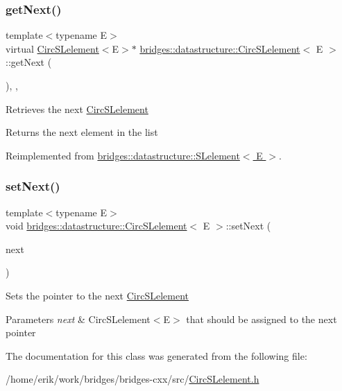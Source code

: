 \subsubsection{\texorpdfstring{get\+Next()}{getNext()}}
{\footnotesize\ttfamily template$<$typename E$>$ \\
virtual \hyperlink{classbridges_1_1datastructure_1_1_circ_s_lelement}{Circ\+S\+Lelement}$<$E$>$$\ast$ \hyperlink{classbridges_1_1datastructure_1_1_circ_s_lelement}{bridges\+::datastructure\+::\+Circ\+S\+Lelement}$<$ E $>$\+::get\+Next (\begin{DoxyParamCaption}{ }\end{DoxyParamCaption})\hspace{0.3cm}{\ttfamily [inline]}, {\ttfamily [override]}, {\ttfamily [virtual]}}

Retrieves the next \hyperlink{classbridges_1_1datastructure_1_1_circ_s_lelement}{Circ\+S\+Lelement} \begin{DoxyReturn}{Returns}
the next element in the list 
\end{DoxyReturn}


Reimplemented from \hyperlink{classbridges_1_1datastructure_1_1_s_lelement_ae43dd771d9ced7cb17f1d35f34cd9a42}{bridges\+::datastructure\+::\+S\+Lelement$<$ E $>$}.

\mbox{\label{classbridges_1_1datastructure_1_1_circ_s_lelement_a623d302217fce43a444e6da5e1de9b40}} 
\subsubsection{\texorpdfstring{set\+Next()}{setNext()}}
{\footnotesize\ttfamily template$<$typename E$>$ \\
void \hyperlink{classbridges_1_1datastructure_1_1_circ_s_lelement}{bridges\+::datastructure\+::\+Circ\+S\+Lelement}$<$ E $>$\+::set\+Next (\begin{DoxyParamCaption}\item[{\hyperlink{classbridges_1_1datastructure_1_1_circ_s_lelement}{Circ\+S\+Lelement}$<$ E $>$ $\ast$}]{next }\end{DoxyParamCaption})\hspace{0.3cm}{\ttfamily [inline]}}

Sets the pointer to the next \hyperlink{classbridges_1_1datastructure_1_1_circ_s_lelement}{Circ\+S\+Lelement} 
\begin{DoxyParams}{Parameters}
{\em next} & Circ\+S\+Lelement$<$\+E$>$ that should be assigned to the next pointer \\
\hline
\end{DoxyParams}


The documentation for this class was generated from the following file\+:\begin{DoxyCompactItemize}
\item 
/home/erik/work/bridges/bridges-\/cxx/src/\hyperlink{_circ_s_lelement_8h}{Circ\+S\+Lelement.\+h}\end{DoxyCompactItemize}
